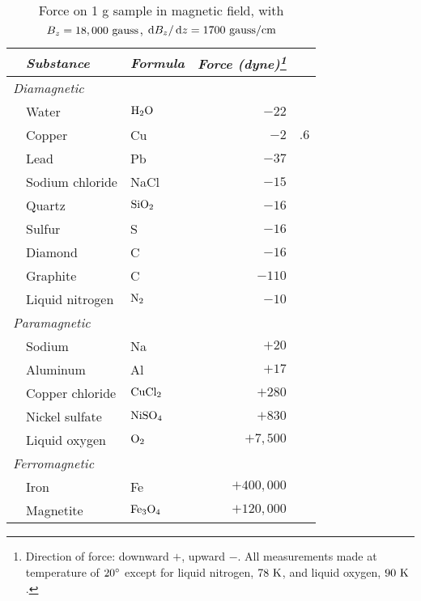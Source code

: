 \begin{table} %
\caption{Force on 1 g sample in magnetic field, with $B_z=18,000\ \textup{gauss}$, $\der B_z/\der z = 1700\ \zu{gauss}/\cmunit$}\label{table:magnetic-forces}
\begin{tabular}{lllr@{}l} %
\hline
\quad & \emph{Substance} & \emph{Formula} & \emph{Force (dyne)\footnote{Direction of force:
downward $+$, upward $-$. All measurements made at temperature of $20\mspace{0mu}^\circ$ except for
liquid nitrogen, $78\ \textup{K}$, and liquid oxygen, $90\ \textup{K}$.
}} \\
\hline
\multicolumn{2}{l}{\emph{Diamagnetic}} \\
  & Water          & $\textup{H}_2\textup{O}$      & $-22$ \\
  & Copper         & Cu                    & $-2$&$.6$ \\ %
  & Lead           & Pb                    & $-37$ \\
  & Sodium chloride & NaCl                 & $-15$ \\
  & Quartz         & $\textup{SiO}_2$          & $-16$ \\
  & Sulfur         & S                     & $-16$ \\
  & Diamond        & C                     & $-16$ \\
  & Graphite       & C                     & $-110$ \\
  & Liquid nitrogen & $\textup{N}_2$           & $-10$ \\
\multicolumn{2}{l}{\emph{Paramagnetic}} \\
  & Sodium         & Na                    & $+20$ \\
  & Aluminum       & Al                    & $+17$ \\
  & Copper chloride & $\textup{CuCl}_2$        & $+280$ \\
  & Nickel sulfate & $\textup{NiSO}_4$         & $+830$ \\
  & Liquid oxygen  & $\textup{O}_2$            & $+7,500$ \\
\multicolumn{2}{l}{\emph{Ferromagnetic}} \\
  & Iron           & Fe                    & $+400,000$ \\
  & Magnetite      & $\textup{Fe}_3\textup{O}_4$   & $+120,000$
\end{tabular}
\end{table}



